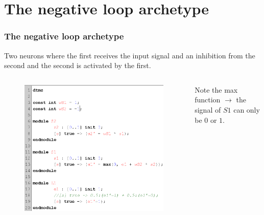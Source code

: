 \section{The negative loop archetype}
\begin{frame}
  \frametitle{The negative loop archetype}

  \begin{definition}
    Two neurons where the first receives the input signal and an inhibition from the second and the second is activated by the first.
  \end{definition}

  \begin{columns}
    \begin{column}{0.45\textwidth}
      \begin{figure}
        \includegraphics[width=1\textwidth]{pic/neg_loop_simple.png}
      \end{figure}
    \end{column}
    \begin{column}{0.45\textwidth}
      \begin{remark}
        Note the max function $\rightarrow$ the signal of $S1$ can only be $0$ or $1$.
      \end{remark}
    \end{column}
  \end{columns}

\end{frame}

